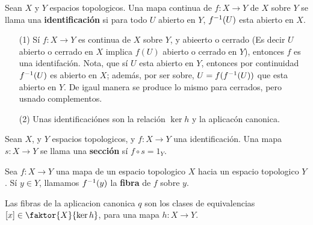 \begin{definition}
    Sean $X$ y  $Y$ espacios topologicos. Una mapa continua de $f:X
    \xrightarrow{} Y$ de $X$ sobre  $Y$ se llama una  \textbf{identificaci\'on}
    si para todo $U$ abierto en  $Y$, $f^{-1}(U)$ esta abierto en $X$.
\end{definition}

\begin{example}\label{}
    \begin{enumerate}
        \item[(1)] S\'i $f: X \xrightarrow{} Y$ es continua de $X$ sobre  $Y$, y
            abieerto o cerrado  (Es decir $U$ abierto o cerrado en  $X$ implica
             $f(U)$ abierto o cerrado en $Y$), entonces $f$ es una
             identifaci\'on. Nota, que  s\'i $U$ esta abierto en  $Y$, entonces
             por continuidad  $f^{-1}(U)$ es abierto en $X$; adem\'as, por ser
             sobre,  $U=f(f^{-1}(U))$ que esta abierto en $Y$. De igaul manera
             se produce lo mismo para cerrados, pero usnado complementos.

         \item[(2)]  Unas identificaci\'ones son la relaci\'on $\ker{h}$ y la
             aplicac\'on canonica.
    \end{enumerate}
\end{example}

\begin{definition}
    Sean $X$, y  $Y$ espacios topologicos, y  $f:X \xrightarrow{} Y$ una
    identificaci\'on. Una mapa $s:X \xrightarrow{} Y$ se llama una
    \textbf{secci\'on} s\'i $f \circ s=1_Y$.
\end{definition}

\begin{definition}
    Sea $f:X \xrightarrow{} Y$ una mapa de un espacio topologico $X$ hacia un
    espacio topologico  $Y$. S\'i $y \in Y$, llamamos  $f^{-1}(y)$ la
    \textbf{fibra} de $f$ sobre  $y$.
\end{definition}

\begin{example}\label{}
    Las fibras de la aplicacion canonica $q$ son los clases de equivalencias
    $[x] \in \faktor{X}{\ker{h}}$, para una mapa $h:X \xrightarrow{} Y$.
\end{example}

